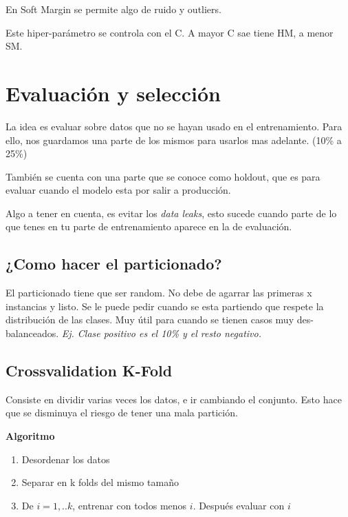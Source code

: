 \documentclass[titlepage,a4paper]{article}
\begin{document}
En Soft Margin se permite algo de ruido y outliers.

Este hiper-parámetro se controla con el C. A mayor C sae tiene HM, a menor SM.



\section{Evaluación y selección}

La idea es evaluar sobre datos que no se hayan usado en el entrenamiento. Para ello, nos guardamos una parte de los mismos para usarlos mas adelante. (10\% a 25\%)

También se cuenta con una parte que se conoce como holdout, que es para evaluar cuando el modelo esta por salir a producción.

Algo a tener en cuenta, es evitar los \textit{data leaks}, esto sucede cuando parte de lo que tenes en tu parte de entrenamiento aparece en la de evaluación.

\subsection{¿Como hacer el particionado?}

El particionado tiene que ser random. No debe de agarrar las primeras x instancias y listo. Se le puede pedir cuando se esta partiendo que respete la distribución de las clases. Muy útil para cuando se tienen casos muy des-balanceados. \textit{Ej. Clase positivo es el 10\% y el resto negativo.}


\subsection{Crossvalidation K-Fold}

Consiste en dividir varias veces los datos, e ir cambiando el conjunto. Esto hace que se disminuya el riesgo de tener una mala partición.

\textbf{Algoritmo}
\begin{enumerate}
    \item Desordenar los datos
    \item Separar en k folds del mismo tamaño
    \item De $i = 1,..k$, entrenar con todos menos $i$. Después evaluar con $i$  
\end{enumerate}
\end{document}
